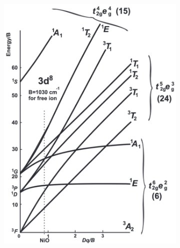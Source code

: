 \begin{figure}[ht]
    \centering
    \begin{subfigure}[b]{0.4\textwidth}
        \includegraphics[width=\textwidth]{pictures/4.png}
        \caption{}
        \label{fig:4}
    \end{subfigure}
    \hspace{1cm}
    \begin{subfigure}[b]{0.4\textwidth}

\end{subfigure}
\end{figure}
